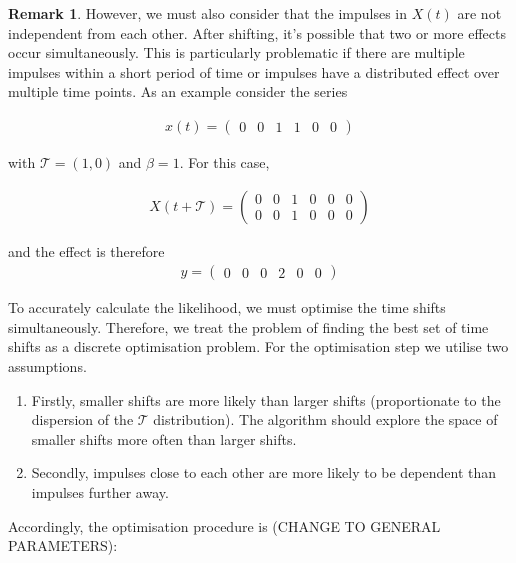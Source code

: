 \documentclass[11pt]{amsart}
\theoremstyle{definition}
\newtheorem{remark}{Remark}[section]
\begin{document}
\begin{remark}
However, we must also consider that the impulses in $X(t)$ are not independent from each other. After shifting, it's possible that two or more effects occur simultaneously. This is particularly problematic if there are multiple impulses within a short period of time or impulses have a distributed effect over multiple time points. As an example consider the series 

\begin{align*}
x(t) = 
\left(
\begin{array}{cccccc}
0 & 0 & 1 & 1 & 0 & 0
\end{array}  
\right)
\end{align*}

with $\mathcal{T}= (1, 0)$ and $\beta = 1$. For this case, 

\begin{align*}
X(t + \mathcal{T}) = 
\left(
\begin{array}{cccccc}
0 & 0 & 1 & 0 & 0 & 0 \\
0 & 0 & 1 & 0 & 0 & 0 
\end{array}  
\right)
\end{align*}

and the effect is therefore 
\begin{align*}
y = 
\left(
\begin{array}{cccccc}
0 & 0 & 0 & 2 & 0 & 0
\end{array}  
\right)
\end{align*}
\end{remark}

To accurately calculate the likelihood, we must optimise the time shifts simultaneously. Therefore, we treat the problem of finding the best set of time shifts as a discrete optimisation problem. For the optimisation step we utilise two assumptions.

\begin{enumerate}
\item Firstly, smaller shifts are more likely than larger shifts (proportionate to the dispersion of the $\mathcal{T}$ distribution). The algorithm should explore the space of smaller shifts more often than larger shifts. 
\item Secondly, impulses close to each other are more likely to be dependent than impulses further away. 
\end{enumerate}


Accordingly, the optimisation procedure is (CHANGE TO GENERAL PARAMETERS):
\end{document}
